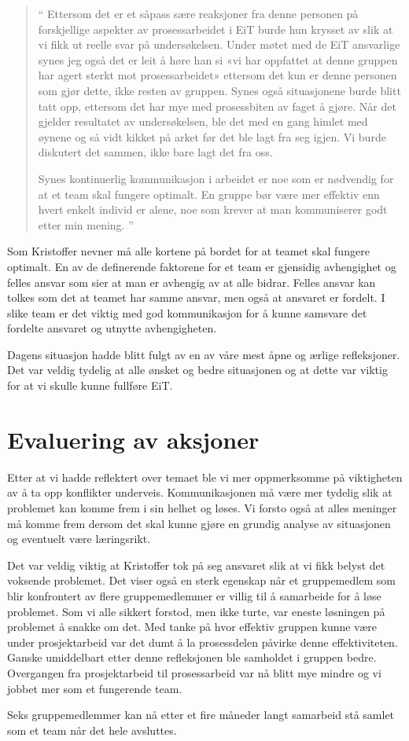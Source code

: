 \begin{quote}``
Ettersom det er et såpass sære reaksjoner fra denne personen på 
forskjellige aspekter av prosessarbeidet i EiT burde hun krysset av slik at vi fikk ut reelle svar på undersøkelsen. 
Under møtet med de EiT ansvarlige synes jeg også det er leit å høre han si «vi har oppfattet at denne gruppen har agert 
sterkt mot prosessarbeidet» ettersom det kun er denne personen som gjør dette, ikke resten av gruppen. Synes 
også situasjonene burde blitt tatt opp, ettersom det har mye med prosessbiten av faget å gjøre. Når det gjelder 
resultatet av undersøkelsen, ble det med en gang himlet med øynene og så vidt kikket på arket før det ble lagt fra 
seg igjen. Vi burde diskutert det sammen, ikke bare lagt det fra oss.

Synes kontinuerlig kommunikasjon i arbeidet er noe som er nødvendig for at et team skal fungere optimalt. En 
gruppe bør være mer effektiv enn hvert enkelt individ er alene, noe som krever at man kommuniserer godt etter min 
mening.
''\end{quote} 

Som Kristoffer nevner må alle kortene på bordet for at teamet skal fungere optimalt. En av de definerende faktorene
for et team er gjensidig avhengighet og felles ansvar \cite{Artikkel4} som sier at man er avhengig av at
alle bidrar. Felles ansvar kan tolkes som det at teamet har samme ansvar, men også at ansvaret er fordelt. I slike 
team er det viktig med god kommunikasjon for å kunne samsvare det fordelte ansvaret og utnytte avhengigheten.

Dagens situasjon hadde blitt fulgt av en av våre mest åpne og ærlige refleksjoner. Det var veldig tydelig at
alle ønsket og bedre situasjonen og at dette var viktig for at vi skulle kunne fullføre EiT. 

\section{Evaluering av aksjoner}

Etter at vi hadde reflektert over temaet ble vi mer oppmerksomme på viktigheten av å ta opp konflikter underveis.
Kommunikasjonen må være mer tydelig slik at problemet kan komme frem i sin helhet og løses. 
Vi forsto også at alles meninger må komme frem dersom det skal kunne gjøre en grundig analyse av situasjonen
og eventuelt være læringsrikt. 

Det var veldig viktig at Kristoffer tok på seg ansvaret slik at vi fikk belyst det voksende problemet.
Det viser også en sterk egenskap når et gruppemedlem som blir konfrontert av flere gruppemedlemmer er villig til 
å samarbeide for å løse problemet. 
Som vi alle sikkert forstod, men ikke turte, var eneste løsningen på problemet å snakke om det. 
Med tanke på hvor effektiv gruppen kunne være under prosjektarbeid var det dumt å la prosessdelen påvirke
denne effektiviteten. Ganske umiddelbart etter denne refleksjonen ble samholdet i gruppen bedre.
Overgangen fra prosjektarbeid til prosessarbeid var nå blitt mye mindre og vi jobbet mer som et fungerende team.

Seks gruppemedlemmer kan nå etter et fire måneder langt samarbeid stå samlet som et team når det hele avsluttes.